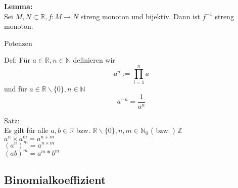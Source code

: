 \documentclass[headsepline,12pt,a4paper]{scrartcl}
\begin{document}
\item \textbf{ Lemma:} \\
Sei $ M,N \subset \mathbb{R} , f: M \rightarrow N $ streng monoton und bijektiv. Dann ist $f^{-1}$ streng monoton.

\begin{center}
\item[Potenzen]
\end{center}
\item Def: Für $a \in \mathbb{R} , n \in \mathbb{N} $ definieren wir \\
$$ a^n:= \prod\limits_{i=1}^n a $$
und für $ a \in \mathbb{R} \backslash \{ 0 \}, n \in \mathbb{N} $ \\
$$ a^{-n} = \frac{1}{a^n} $$
\item Satz: \\
Es gilt für alle $a,b \in \mathbb{R}$ bzw. $ \mathbb{R} \backslash \{ 0 \} , n,m \in \mathbb{N}_{0} $ ( bzw. ) $\mathbb{Z}$\\
$a^n \times a^m = a^{n+m} $\\
$(a^n)^m = a^{n\times m} $ \\
$ (ab)^m = a^m * b^m $ 



\subsection*{Binomialkoeffizient}
\end{document}
